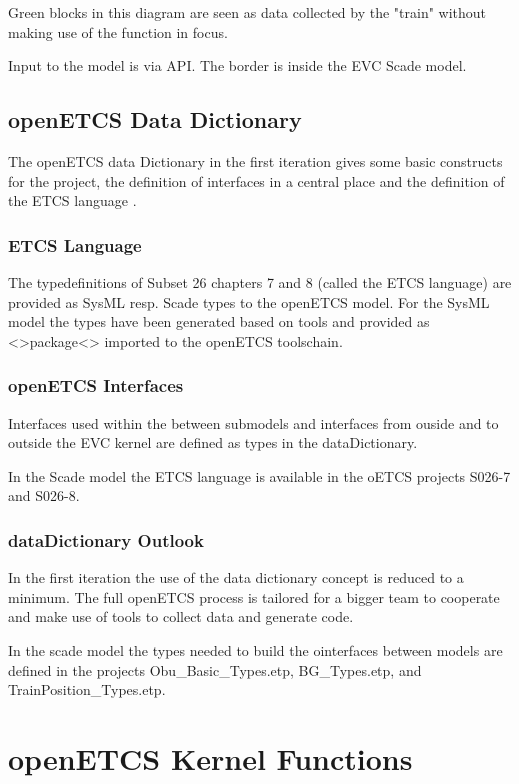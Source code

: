 \documentclass{template/openetcs_report}
\begin{document}
Green blocks in this diagram are seen as data collected by the "train" without making use of the function in focus.

Input to the model is via API. The border is inside the EVC Scade model. 

\section{openETCS Data Dictionary}
The openETCS data Dictionary in the first iteration gives some basic constructs for the project, the definition of interfaces in a central place and the definition of the ETCS language \cite{dataDictionary}.

\subsection{ETCS Language}
The typedefinitions of Subset 26 chapters 7 and 8 (called the ETCS language) are provided as SysML resp. Scade types to the openETCS model. For the SysML model the types have been generated based on tools and provided as <>package<> imported to the openETCS toolschain.



\subsection{openETCS Interfaces}
Interfaces used within the between submodels and interfaces from ouside and to outside the EVC kernel are defined as types in the dataDictionary.

In the Scade model  the ETCS language is available in the oETCS projects S026-7 and S026-8.

\subsection{dataDictionary Outlook}
In the first iteration the use of the data dictionary concept is reduced to a minimum. The full openETCS process is tailored for a bigger team to cooperate and make use of tools to collect data and generate code. 

In the scade model the types needed to build the ointerfaces between models are defined in the projects Obu\_Basic\_Types.etp, BG\_Types.etp, and TrainPosition\_Types.etp.


\chapter{openETCS Kernel Functions}
\end{document}
